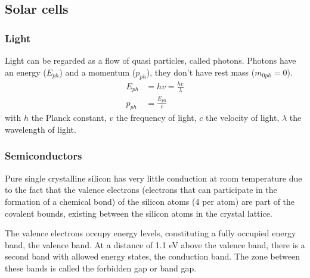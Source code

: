 \documentclass[a4paper,10pt]{article}
\begin{document}
\subsection{Solar cells}
\subsubsection{Light}
Light can be regarded as a flow of quasi particles, called photons. Photons have an energy ($E_{ph}$) and a momentum ($p_{ph}$), they don't have rest mass ($m_{0ph} = 0$).
\begin{align}
 E_{ph} &= hv = \frac{hc}{\lambda} \\
 p_{ph} &= \frac{E_{ph}}{c}
\end{align}
with $h$ the Planck constant, $v$ the frequency of light, $c$ the velocity of light, $\lambda$ the wavelength of light.

\subsubsection{Semiconductors}

Pure single crystalline silicon has very little conduction at room temperature due to the fact that the valence electrons (electrons that can participate in the formation of a chemical bond) of the silicon atoms (4 per atom) are part of the covalent bounds, existing between the silicon atoms in the crystal lattice. \bigskip

The valence electrons occupy energy levels, constituting a fully occupied energy band, the valence band. At a distance of 1.1 eV above the valence band, there is a second band with allowed energy states, the conduction band. The zone between these bands is called the forbidden gap or band gap.
\end{document}
